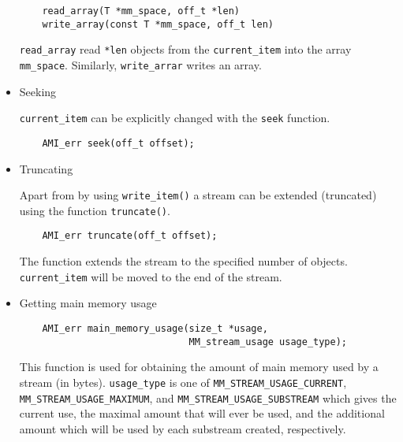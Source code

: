 \begin{itemize}
\begin{verbatim}
    read_array(T *mm_space, off_t *len)
    write_array(const T *mm_space, off_t len)
\end{verbatim}

\verb|read_array| read \verb|*len| objects from the \verb|current_item| into
the array \verb|mm_space|. Similarly, \verb|write_arrar| writes an
array.

\item{Seeking}

\verb|current_item| can be explicitly changed with the \verb|seek| function.

\begin{verbatim}
    AMI_err seek(off_t offset);
\end{verbatim}

\item{Truncating}

Apart from by using \verb|write_item()| a stream can be extended
(truncated) using the function \verb|truncate()|.

\begin{verbatim}
    AMI_err truncate(off_t offset);
\end{verbatim}
The function extends the stream to the specified number of
objects. \verb|current_item| will be moved to the end of the stream.

\item{Getting main memory usage}

\begin{verbatim}
    AMI_err main_memory_usage(size_t *usage,
                              MM_stream_usage usage_type);
\end{verbatim}

This function is used for obtaining the amount of main memory used by a
stream (in bytes). \verb|usage_type| is one of
\verb|MM_STREAM_USAGE_CURRENT|, \verb|MM_STREAM_USAGE_MAXIMUM|, and
\verb|MM_STREAM_USAGE_SUBSTREAM| which gives the current use, the maximal
amount that will ever be used, and the additional amount which will be used
by each substream created, respectively.


\end{itemize}
